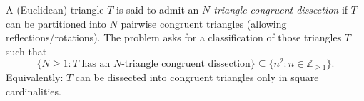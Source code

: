 A (Euclidean) triangle $T$ is said to admit an \emph{$N$-triangle congruent dissection} if $T$ can be partitioned into $N$ pairwise congruent triangles (allowing reflections/rotations).  The problem asks for a classification of those triangles $T$ such that
\[
  \{N\ge 1 : T \text{ has an } N\text{-triangle congruent dissection}\}\subseteq \{n^2 : n\in\mathbb{Z}_{\ge 1}\}.
\]
Equivalently: $T$ can be dissected into congruent triangles only in square cardinalities.
